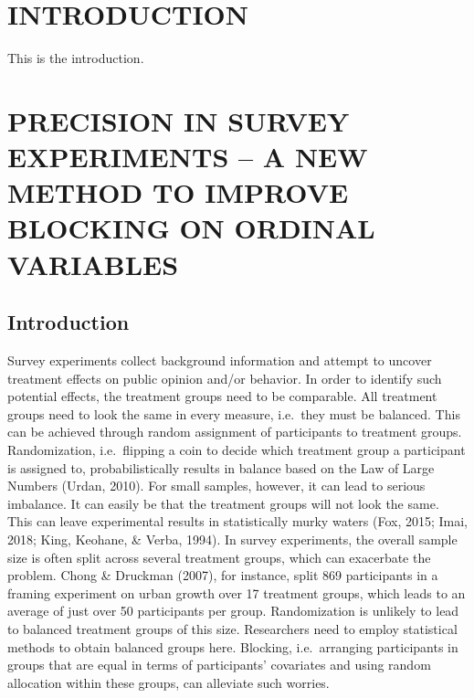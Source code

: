 \documentclass[12pt,econ]{sources/authesis}
\begin{document}
\begin{frontmatter}





\listoftables

\listoffigures

\tableofcontents


\end{frontmatter}

\hypertarget{introduction}{%
\chapter{INTRODUCTION}\label{introduction}}

This is the introduction.

\hypertarget{ordblock}{%
\chapter{PRECISION IN SURVEY EXPERIMENTS -- A NEW METHOD TO IMPROVE BLOCKING ON ORDINAL VARIABLES}\label{ordblock}}

\hypertarget{ordblock-intro}{%
\section{Introduction}\label{ordblock-intro}}

Survey experiments collect background information and attempt to uncover treatment effects on public opinion and/or behavior. In order to identify such potential effects, the treatment groups need to be comparable. All treatment groups need to look the same in every measure, i.e.~they must be balanced. This can be achieved through random assignment of participants to treatment groups. Randomization, i.e.~flipping a coin to decide which treatment group a participant is assigned to, probabilistically results in balance based on the Law of Large Numbers (Urdan, 2010). For small samples, however, it can lead to serious imbalance. It can easily be that the treatment groups will not look the same. This can leave experimental results in statistically murky waters (Fox, 2015; Imai, 2018; King, Keohane, \& Verba, 1994). In survey experiments, the overall sample size is often split across several treatment groups, which can exacerbate the problem. Chong \& Druckman (2007), for instance, split 869 participants in a framing experiment on urban growth over 17 treatment groups, which leads to an average of just over 50 participants per group. Randomization is unlikely to lead to balanced treatment groups of this size. Researchers need to employ statistical methods to obtain balanced groups here. Blocking, i.e.~arranging participants in groups that are equal in terms of participants' covariates and using random allocation within these groups, can alleviate such worries.
\end{document}
